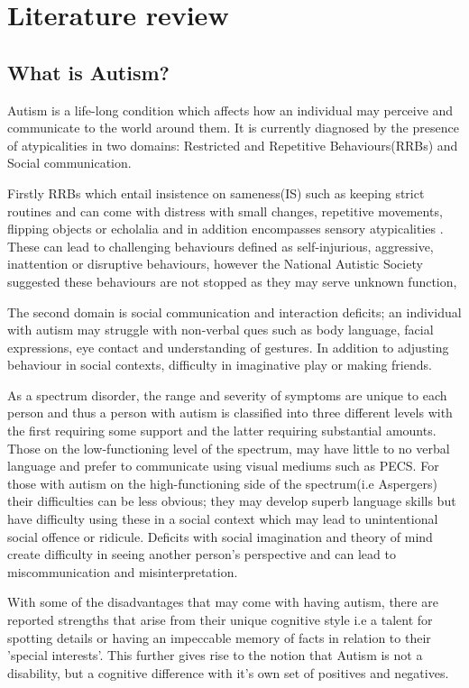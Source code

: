 \chapter{Literature review}

\section{What is Autism?}

Autism is a life-long condition which affects how an individual may perceive and communicate to the world around them\cite{nas}. It is currently diagnosed by the presence of atypicalities in two domains: Restricted and Repetitive Behaviours(RRBs) and Social communication.

Firstly RRBs which entail insistence on sameness(IS) such as keeping strict routines and can come with distress with small changes, repetitive movements, flipping objects or echolalia and in addition encompasses sensory atypicalities \cite{dsm52}. These can lead to challenging behaviours defined as self-injurious, aggressive, inattention or disruptive behaviours\cite{teacherchallenge}, however the National Autistic Society suggested these behaviours are not stopped as they may serve unknown function,
 
The second domain is social communication and interaction deficits; an individual with autism may struggle with non-verbal ques such as body language, facial expressions, eye contact and understanding of gestures. In addition to adjusting behaviour in social contexts, difficulty in imaginative play or making friends.  

As a spectrum disorder, the range and severity of symptoms are unique to each person and thus a person with autism is classified into three different levels with the first requiring some support and the latter requiring substantial amounts\cite{dsm52}. Those on the low-functioning level of the spectrum, may have little to no verbal language and prefer to communicate using visual mediums such as PECS. For those with autism on the high-functioning side of the spectrum(i.e Aspergers) their difficulties can be less obvious; they may develop superb language skills but have difficulty using these in a social context which may lead to unintentional social offence or ridicule. Deficits with social imagination and theory of mind create difficulty in seeing another person's perspective and can lead to miscommunication and misinterpretation. 

With some of the disadvantages that may come with having autism, there are reported strengths that arise from their unique cognitive style i.e a talent for spotting details\cite{bayes} or having an impeccable memory of facts in relation to their 'special interests'. This further gives rise to the notion that Autism is not a disability, but a cognitive difference with it's own set of positives and negatives. 

